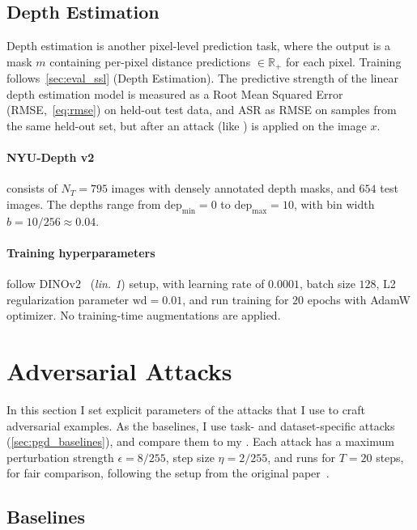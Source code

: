 \subsection{Depth Estimation}

Depth estimation is another pixel-level prediction task, where the output is a mask $m$ containing per-pixel distance predictions $\in\mathbb{R}_+$ for each pixel. Training follows~\cref{sec:eval_ssl} (Depth Estimation). The predictive strength of the linear depth estimation model is measured as a Root Mean Squared Error (RMSE,~\cref{eq:rmse}) on held-out test data, and ASR as RMSE on samples from the same held-out set, but after an attack (like \DepthPGD) is applied on the image $x$.

\paragraph{NYU-Depth v2~\cite{nyudepth}} consists of $N_T=795$ images with densely annotated depth masks, and $654$ test images. The depths range from $\text{dep}_\text{min}=0$ to $\text{dep}_\text{max}=10$, with bin width $b=10/256\approx0.04$.

\paragraph{Training hyperparameters} follow DINOv2~\cite{dinov2} (\textit{lin. 1}) setup, with learning rate of $0.0001$, batch size $128$, L2 regularization parameter $\text{wd}=0.01$, and run training for $20$ epochs with AdamW optimizer. No training-time augmentations are applied.

\section{Adversarial Attacks}

In this section I set explicit parameters of the attacks that I use to craft adversarial examples. As the baselines, I use task- and dataset-specific attacks (\cref{sec:pgd_baselines}), and compare them to my \EmbedAttack. Each attack has a maximum perturbation strength $\epsilon=8/255$, step size $\eta=2/255$, and runs for $T=20$ steps, for fair comparison, following the setup from the original \PGD paper~\cite{pgd}.

\subsection{Baselines}


